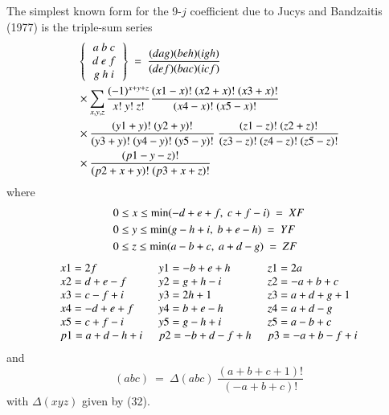 The simplest known form for the 9-$j$ coefficient due to Jucys and Bandzaitis (1977) is the triple-sum series
\begin{equation}
\begin{split}
& \left\{
\begin{tabular}{c}
$a \ b \ c$\\   
$d \ e\ f$\\ 
$g \ h \ i$\\ 
\end{tabular} 
\right\} \
=\ \frac{(dag)(beh)(igh)}{(def)(bac)(icf)}\\
& \times \sum_{x,y,z} \frac{(-1)^{x+y+z}}{x!\ y!\ z!} \frac{(x1-x)!\ (x2+x)!\ (x3+x)!}
{(x4-x)!\ (x5-x)!}\\
& \times\frac{(y1+y)!\ (y2+y)!}{(y3+y)!\ (y4-y)!\ (y5-y)!} \ \frac{(z1-z)!\ (z2+z)!}{(z3-z)!\ (z4-z)!\ (z5-z)!}\\
& \times \frac{(p1-y-z)!}{(p2+x+y)!\ (p3+x+z)!} \label{chap29-eq54}
\end{split}
\end{equation}
where
\begin{equation}
\begin{split}
& 0 \leq x \leq {\rm min} (-d+e+f,\ c+f-i)\ =\ XF \\
& 0 \leq y \leq {\rm min} ( g-h+i,\ b+e-h)\ =\ YF \\
& 0 \leq z \leq {\rm min} ( a-b+c,\ a+d-g)\ =\ ZF \label{chap29-eq55}
\end{split}
\end{equation}
\begin{equation}
\begin{tabular}{lll}
$x1=2f$ &\ $y1=-b+e+h$ &\ $z1=2a$ \\
$x2=d+e-f$ &\ $y2=g+h-i$ &\ $z2=-a+b+c$ \\
$x3=c-f+i$ &\ $y3=2h+1$ &\ $z3=a+d+g+1$\\
$x4=-d+e+f$ &\ $y4=b+e-h$ &\ $z4=a+d-g$ \\
$x5=c+f-i$ &\ $y5=g-h+i$ &\ $z5=a-b+c$ \\
$p1=a+d-h+i$ &\ $p2=-b+d-f+h$ &\ $p3=-a+b-f+i$\label{chap29-eq56}
\end{tabular}
\end{equation}
and 
\begin{equation}
(abc)\ =\ \Delta(abc)\ \frac{(a+b+c+1)!}{(-a+b+ c)!}\label{chap29-eq57}
\end{equation}
with $\Delta(xyz)$ given by (32).

